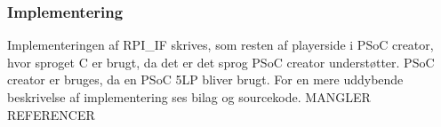 \documentclass[Rapport/Playerside/RPI_IF/RPI_IF.tex]{subfiles}
\begin{document}
\subsubsection{Implementering}
Implementeringen af RPI\_IF skrives, som resten af playerside i PSoC creator, hvor sproget C er brugt, da det er det sprog PSoC creator understøtter. PSoC creator er bruges, da en PSoC 5LP bliver brugt. For en mere uddybende beskrivelse af implementering ses bilag og sourcekode. MANGLER REFERENCER
\end{document}
